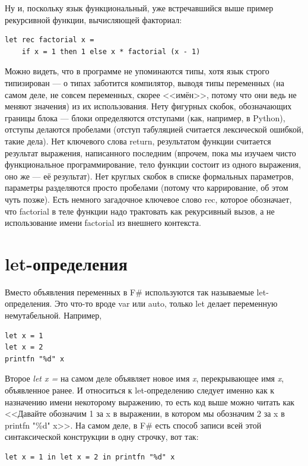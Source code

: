 \documentclass[a5paper]{article}
\begin{document}
Ну и, поскольку язык функциональный, уже встречавшийся выше пример рекурсивной функции, вычисляющей факториал:

\begin{verbatim}
let rec factorial x =
    if x = 1 then 1 else x * factorial (x - 1)
\end{verbatim}

Можно видеть, что в программе не упоминаются типы, хотя язык строго типизирован --- о типах заботится компилятор, выводя типы переменных (на самом деле, не совсем переменных, скорее <<имён>>, потому что они ведь не меняют значения) из их использования. Нету фигурных скобок, обозначающих границы блока --- блоки определяются отступами (как, например, в Python), отступы делаются пробелами (отступ табуляцией считается лексической ошибкой, такие дела). Нет ключевого слова return, результатом функции считается результат выражения, написанного последним (впрочем, пока мы изучаем чисто функциональное программирование, тело функции состоит из одного выражения, оно же --- её результат). Нет круглых скобок в списке формальных параметров, параметры разделяются просто пробелами (потому что каррирование, об этом чуть позже). Есть немного загадочное ключевое слово rec, которое обозначает, что factorial в теле функции надо трактовать как рекурсивный вызов, а не использование имени factorial из внешнего контекста.

\section{let-определения}

Вместо объявления переменных в F\# используются так называемые let-определения. Это что-то вроде var или auto, только let делает переменную немутабельной. Например,

\begin{verbatim}
let x = 1
let x = 2
printfn "%d" x
\end{verbatim}

Второе \textit{let x =} на самом деле объявляет новое имя \textit{x}, перекрывающее имя \textit{x}, объявленное ранее. И относиться к let-определению следует именно как к назначению имени некоторому выражению, то есть код выше можно читать как <<Давайте обозначим 1 за x в выражении, в котором мы обозначим 2 за x в printfn "\%d" x>>. На самом деле, в F\# есть способ записи всей этой синтаксической конструкции в одну строчку, вот так:

\begin{verbatim}
let x = 1 in let x = 2 in printfn "%d" x
\end{verbatim}
\end{document}
